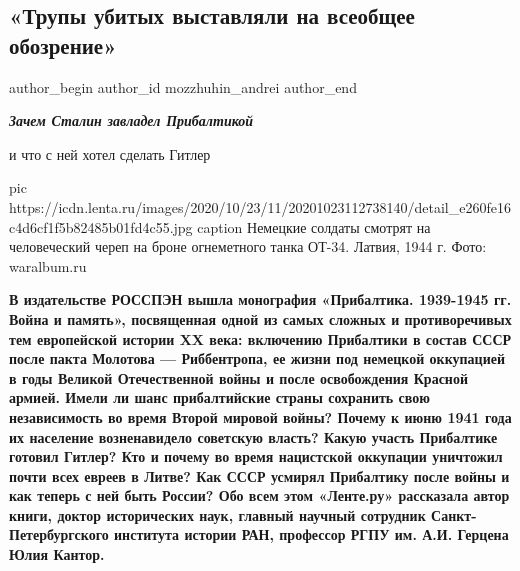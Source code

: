  
 
 
 
 
 
\subsection{«Трупы убитых выставляли на всеобщее обозрение»}
\label{sec:02_12_2020.news.ru.lenta_ru.mozzhuhin_andrei.1.pribaltika}
\ifcmt
	author_begin
   author_id mozzhuhin_andrei
	author_end
\fi
{}

\begin{center}
	\em\bfseries\color{red}\huge 
	Зачем Сталин завладел Прибалтикой\par и что с ней хотел сделать Гитлер
\end{center}

\ifcmt
pic https://icdn.lenta.ru/images/2020/10/23/11/20201023112738140/detail_e260fe16c4d6cf1f5b82485b01fd4c55.jpg
caption Немецкие солдаты смотрят на человеческий череп на броне огнеметного танка ОТ-34. Латвия, 1944 г. Фото: waralbum.ru
\fi

\def\lenta#1{\textbf{\em\color{blue} #1}}

\begin{leftbar}
	\bfseries
В издательстве РОССПЭН вышла монография «Прибалтика. 1939-1945 гг. Война и
память», посвященная одной из самых сложных и противоречивых тем европейской
истории XX века: включению Прибалтики в состав СССР после пакта Молотова —
Риббентропа, ее жизни под немецкой оккупацией в годы Великой Отечественной
войны и после освобождения Красной армией. Имели ли шанс прибалтийские страны
сохранить свою независимость во время Второй мировой войны? Почему к июню 1941
года их население возненавидело советскую власть? Какую участь Прибалтике
готовил Гитлер? Кто и почему во время нацистской оккупации уничтожил почти всех
евреев в Литве? Как СССР усмирял Прибалтику после войны и как теперь с ней быть
России? Обо всем этом «Ленте.ру» рассказала автор книги, доктор исторических
наук, главный научный сотрудник Санкт-Петербургского института истории РАН,
профессор РГПУ им. А.И. Герцена Юлия Кантор.
\end{leftbar}

